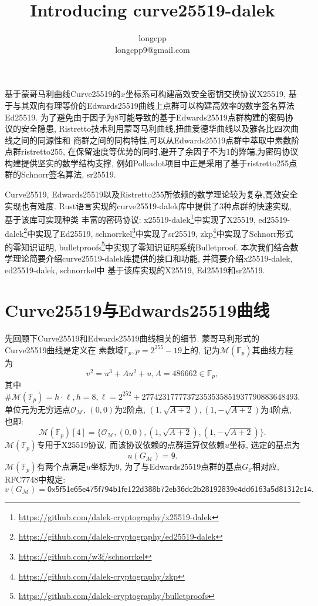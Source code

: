 \documentclass{article}
\newcommand{\F}{\mathbb{F}}
\begin{document}
\title{Introducing \textsf{curve25519-dalek}}
\author{longcpp \\ \small{longcpp9@gmail.com}}

\maketitle

基于蒙哥马利曲线Curve25519的$x$坐标系可构建高效安全密钥交换协议\textsf{X25519},
基于与其双向有理等价的Edwards25519曲线上点群可以构建高效率的数字签名算法\textsf{Ed25519}.
为了避免由于因子为8可能导致的基于Edwards25519点群构建的密码协议的安全隐患,
Ristretto技术利用蒙哥马利曲线,扭曲爱德华曲线以及雅各比四次曲线之间的同源性和
商群之间的同构特性,可以从Edwards25519点群中萃取中素数阶点群\textsf{ristretto255}, 
在保留速度等优势的同时,避开了余因子不为1的弊端,为密码协议构建提供坚实的数学结构支撑,
例如Polkadot项目中正是采用了基于\textsf{ristretto255}点群的Schnorr签名算法, \textsf{sr25519}.

Curve25519, Edwards25519以及Ristretto255所依赖的数学理论较为复杂,高效安全实现也有难度.
Rust语言实现的\textsf{curve25519-dalek}库中提供了3种点群的快速实现, 基于该库可实现种类
丰富的密码协议: 
\textsf{x25519-dalek}\footnote{\url{https://github.com/dalek-cryptography/x25519-dalek}}中实现了\textsf{X25519},
\textsf{ed25519-dalek}\footnote{\url{https://github.com/dalek-cryptography/ed25519-dalek}}中实现了\textsf{Ed25519}, 
\textsf{schnorrkel}\footnote{\url{https://github.com/w3f/schnorrkel}}中实现了\textsf{sr25519},
\textsf{zkp}\footnote{\url{https://github.com/dalek-cryptography/zkp}}中实现了Schnorr形式的零知识证明, 
\textsf{bulletproofs}\footnote{\url{https://github.com/dalek-cryptography/bulletproofs}}中实现了零知识证明系统Bulletproof.
本次我们结合数学理论简要介绍\textsf{curve25519-dalek}库提供的接口和功能,
并简要介绍\textsf{x25519-dalek}, \textsf{ed25519-dalek}, \textsf{schnorrkel}中
基于该库实现的\textsf{X25519}, \textsf{Ed25519}和\textsf{sr25519}.

\section{Curve25519与Edwards25519曲线}

先回顾下Curve25519和Edwards25519曲线相关的细节. 蒙哥马利形式的Curve25519曲线是定义在
素数域$\F_p, p = 2^{255}-19$上的, 记为$\mathcal{M}(\F_p)$其曲线方程为
$$
v^2 = u^3 + Au^2 + u, A = 486662\in\F_p,
$$
其中$\#\mathcal{M}(\F_p) = h\cdot\ell, h = 8, 
\ell = 2^{252} + 27742317777372353535851937790883648493$.
单位元为无穷远点$\mathcal{O}_{\mathcal{M}}$, $(0,0)$为2阶点, 
$(1, \sqrt{A+2}), (1, -\sqrt{A+2})$为4阶点, 也即:
$$
\mathcal{M}(\F_p)[4] = \{ \mathcal{O}_{\mathcal{M}}, (0,0), (1, \sqrt{A+2}), (1, -\sqrt{A+2}) \}.
$$
$\mathcal{M}(\F_p)$专用于\textsf{X25519}协议, 而该协议依赖的点群运算仅依赖$u$坐标,
选定的基点为
$$
u(G_{\mathcal{M}}) = \textsf{9}.
$$
$\mathcal{M}(\F_p)$有两个点满足$u$坐标为9,
为了与Edwards25519点群的基点$G_{\mathcal{E}}$相对应, RFC7748中规定:
$$
v(G_{\mathcal{M}}) = 
\textsf{0x5f51e65e475f794b1fe122d388b72eb36dc2b28192839e4dd6163a5d81312c14}.
$$
\end{document}
